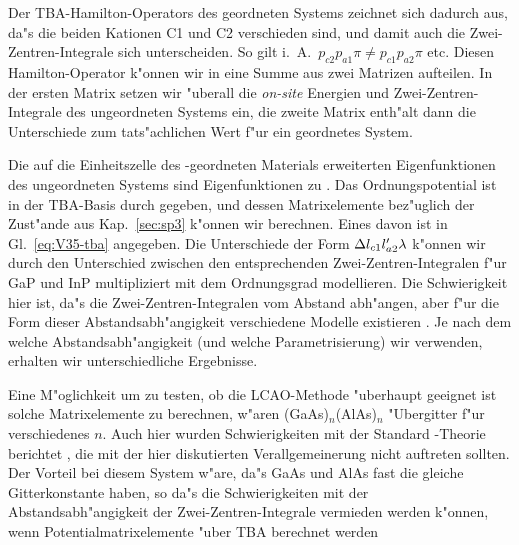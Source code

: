 Der TBA-Hamilton-Operators des geordneten Systems zeichnet sich dadurch aus,
da"s die beiden Kationen C1 und C2 verschieden sind, und damit auch die
Zwei-Zentren-Integrale sich unterscheiden. So gilt i.~A.\ $p_{c2}p_{a1}\pi
\neq p_{c1}p_{a2}\pi$ etc. Diesen Hamilton-Operator k"onnen wir in eine Summe
aus zwei Matrizen aufteilen. In der ersten Matrix 
setzen wir "uberall die \emph{on-site} Energien und Zwei-Zentren-Integrale des
ungeordneten Systems ein, die zweite Matrix 
enth"alt dann die Unterschiede zum tats"achlichen Wert f"ur ein geordnetes
System.

Die auf die Einheitszelle des \CuPt-geordneten Materials erweiterten
Eigenfunktionen des ungeordneten Systems sind Eigenfunktionen zu
. Das Ordnungspotential ist in der TBA-Basis durch
 gegeben, und dessen Matrixelemente bez"uglich der
Zust"ande aus Kap.~\ref{sec:sp3} k"onnen wir berechnen. Eines davon ist
in Gl.~\eqref{eq:V35-tba} angegeben. Die Unterschiede der Form $\Delta
l_{c1}l^{\prime}_{a2}\lambda$ k"onnen wir durch den Unterschied zwischen
den entsprechenden Zwei-Zentren-Integralen f"ur GaP und InP multipliziert mit
dem Ordnungsgrad modellieren. Die Schwierigkeit hier ist, da"s die
Zwei-Zentren-Integralen vom Abstand abh"angen, aber f"ur die Form dieser
Abstandsabh"angigkeit verschiedene Modelle existieren
\cite[p.~504ff]{jsbb:98, harr:80}. Je nach dem welche Abstandsabh"angigkeit
(und welche Parametrisierung) wir verwenden, erhalten wir unterschiedliche
Ergebnisse. 

Eine M"oglichkeit um zu testen, ob die LCAO-Methode "uberhaupt
geeignet ist solche Matrixelemente zu berechnen, w"aren
(GaAs)$_{n}$(AlAs)$_{n}$ "Ubergitter f"ur verschiedenes $n$. Auch hier wurden
Schwierigkeiten mit der Standard \kdotp-Theorie berichtet \cite{wozu:96}, die
mit der hier diskutierten Verallgemeinerung nicht auftreten sollten. Der
Vorteil bei diesem System w"are, da"s GaAs und AlAs fast die gleiche
Gitterkonstante haben, so da"s die Schwierigkeiten mit der
Abstandsabh"angigkeit der Zwei-Zentren-Integrale vermieden werden k"onnen,
wenn Potentialmatrixelemente "uber TBA berechnet werden












